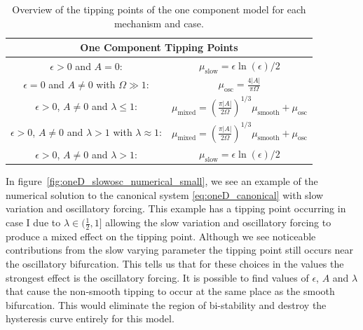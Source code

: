 \begin{center}
\begin{table}[H]\label{table:oneD_tipping}
\centering
\begin{tabular}{|c|c|}
\hline 
 \multicolumn{2}{|c|}{One Component Tipping Points} \\ 
\hline
$\epsilon>0$ and $A=0$: & $\mu_{\text{slow}}=\epsilon\ln(\epsilon)/2$ \\ 
\hline 
$\epsilon=0$ and $A\not=0$ with $\Omega\gg1$: & $\mu_{\text{osc}}=\frac{4|A|}{\pi \Omega}$\\ 
\hline 
$\epsilon>0$, $A\not=0$ and $\lambda\le 1$: & $\mu_{\text{mixed}}=\left(\frac{\pi |A|}{2\Omega}\right)^{1/3} \mu_{\text{smooth}}+\mu_{\text{osc}}$ \\ 
\hline 
$\epsilon>0$, $A\not=0$ and $\lambda> 1$ with $\lambda\approx 1$: & $\mu_{\text{mixed}}=\left(\frac{\pi |A|}{2\Omega}\right)^{1/3} \mu_{\text{smooth}}+\mu_{\text{osc}}$ \\
\hline
$\epsilon>0$, $A\not=0$ and $\lambda>1$: & $ \mu_{\text{slow}}=\epsilon\ln(\epsilon)/2$\\
\hline
\end{tabular} 
\caption{Overview of the tipping points of the one component model for each mechanism and case.}
\end{table}
\end{center}

\indent In figure~\ref{fig:oneD_slowosc_numerical_small}, we see an example of the numerical solution to the canonical system \eqref{eq:oneD_canonical} with slow variation and oscillatory forcing. This example has a tipping point occurring in case I due to $\lambda\in (\frac{1}{2},1]$ allowing the slow variation and oscillatory forcing to produce a mixed effect on the tipping point. Although we see noticeable contributions from the slow varying parameter the tipping point still occurs near the oscillatory bifurcation. This tells us that for these choices in the values the strongest effect is the oscillatory forcing. It is possible to find values of $\epsilon$, $A$ and $\lambda$ that cause the non-smooth tipping to occur at the same place as the smooth bifurcation. This would eliminate the region of bi-stability and destroy the hysteresis curve entirely for this model.

